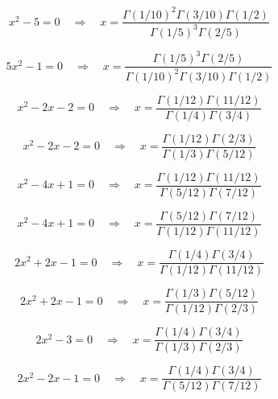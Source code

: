\documentclass[11pt,a4paper]{article}
\begin{document}
\begin{equation}\label{eq:18}
x^{2} - 5 = 0 \quad \Rightarrow \quad x = \frac{\Gamma(1/10)^2\Gamma(3/10)\Gamma(1/2)}{\Gamma(1/5)^3\Gamma(2/5)}
\end{equation}

\begin{equation}\label{eq:19}
5x^{2} - 1 = 0 \quad \Rightarrow \quad x = \frac{\Gamma(1/5)^3\Gamma(2/5)}{\Gamma(1/10)^2\Gamma(3/10)\Gamma(1/2)}
\end{equation}

\begin{equation}\label{eq:20}
x^{2} - 2x - 2 = 0 \quad \Rightarrow \quad x = \frac{\Gamma(1/12)\Gamma(11/12)}{\Gamma(1/4)\Gamma(3/4)}
\end{equation}

\begin{equation}\label{eq:21}
x^{2} - 2x - 2 = 0 \quad \Rightarrow \quad x = \frac{\Gamma(1/12)\Gamma(2/3)}{\Gamma(1/3)\Gamma(5/12)}
\end{equation}

\begin{equation}\label{eq:22}
x^{2} - 4x + 1 = 0 \quad \Rightarrow \quad x = \frac{\Gamma(1/12)\Gamma(11/12)}{\Gamma(5/12)\Gamma(7/12)}
\end{equation}

\begin{equation}\label{eq:23}
x^{2} - 4x + 1 = 0 \quad \Rightarrow \quad x = \frac{\Gamma(5/12)\Gamma(7/12)}{\Gamma(1/12)\Gamma(11/12)}
\end{equation}

\begin{equation}\label{eq:24}
2x^{2} + 2x - 1 = 0 \quad \Rightarrow \quad x = \frac{\Gamma(1/4)\Gamma(3/4)}{\Gamma(1/12)\Gamma(11/12)}
\end{equation}

\begin{equation}\label{eq:25}
2x^{2} + 2x - 1 = 0 \quad \Rightarrow \quad x = \frac{\Gamma(1/3)\Gamma(5/12)}{\Gamma(1/12)\Gamma(2/3)}
\end{equation}

\begin{equation}\label{eq:26}
2x^{2} - 3 = 0 \quad \Rightarrow \quad x = \frac{\Gamma(1/4)\Gamma(3/4)}{\Gamma(1/3)\Gamma(2/3)}
\end{equation}

\begin{equation}\label{eq:27}
2x^{2} - 2x - 1 = 0 \quad \Rightarrow \quad x = \frac{\Gamma(1/4)\Gamma(3/4)}{\Gamma(5/12)\Gamma(7/12)}
\end{equation}
\end{document}
